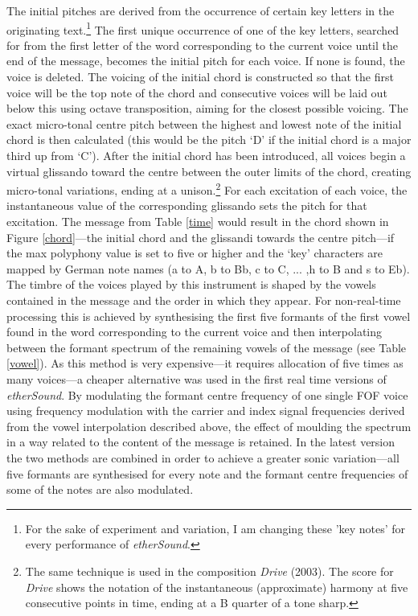 The initial pitches are derived from the occurrence of certain key letters in the originating text.\footnote{For the sake of experiment   and variation, I am changing these 'key notes' for every performance   of \emph{etherSound}.} The first unique occurrence of one of the key letters, searched for from the first letter of the word corresponding to the current voice until the end of the message, becomes the initial pitch for each voice. If none is found, the voice is deleted. The voicing of the initial chord is constructed so that the first voice will be the top note of the chord and consecutive voices will be laid out below this using octave transposition, aiming for the closest possible voicing. 
The exact micro-tonal centre pitch between the highest and lowest note of the initial chord is then calculated (this would be the pitch `D' if the initial chord is a major third up from `C'). After the initial chord has been introduced, all voices begin a virtual glissando toward the centre between the outer limits of the chord, creating micro-tonal variations, ending at a unison.\footnote{The same technique is used in   the composition \emph{Drive} (2003). The score for \emph{Drive}   shows the notation of the instantaneous (approximate) harmony at five consecutive points in time, ending at a B quarter of a tone   sharp.} For each excitation of each voice, the instantaneous value of the corresponding glissando sets the pitch for that excitation. The message from Table \ref{time} would result in the chord shown in Figure \ref{chord}---the initial chord and the glissandi towards the centre pitch---if the max polyphony value is set to five or higher and the `key' characters are mapped by German note names (a to A, b to Bb, c to C, ... ,h to B and s to Eb). 
The timbre of the voices played by this instrument is shaped by the vowels contained in the message and the order in which they appear. For non-real-time processing this is achieved by synthesising the first five formants of the first vowel found in the word corresponding to the current voice and then interpolating between the formant spectrum of the remaining vowels of the message (see Table \ref{vowel}). As this method is very expensive---it requires allocation of five times as many voices---a cheaper alternative was used in the first real time versions of \emph{etherSound}. By modulating the formant centre frequency of one single FOF voice using frequency modulation with the carrier and index signal frequencies derived from the vowel interpolation described above, the effect of moulding the spectrum in a way related to the content of the message is retained. In the latest version the two methods are combined in order to achieve a greater sonic variation---all five formants are synthesised for every note and the formant centre frequencies of some of the notes are also modulated. 
